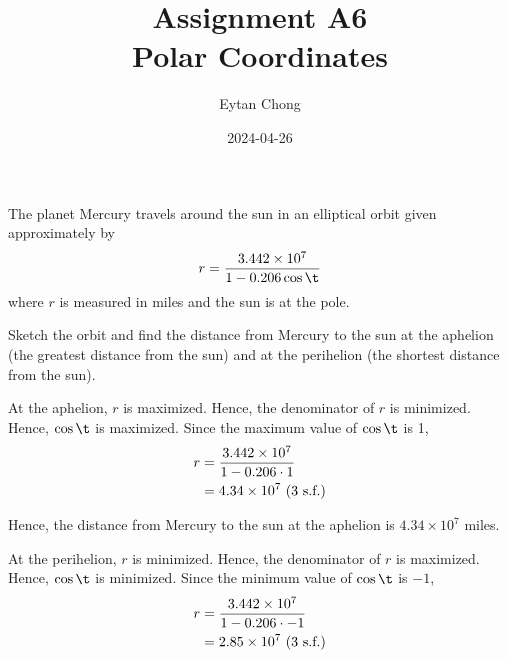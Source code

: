 \documentclass{echw}
\title{Assignment A6\\Polar Coordinates}
\author{Eytan Chong}
\date{2024-04-26}
\begin{document}
    \problem{}
        The planet Mercury travels around the sun in an elliptical orbit given approximately by
        \[
            r = \dfrac{3.442 \times 10^7}{1 - 0.206\cos\t}
        \]
         where $r$ is measured in miles and the sun is at the pole.

        Sketch the orbit and find the distance from Mercury to the sun at the aphelion (the greatest distance from the sun) and at the perihelion (the shortest distance from the sun).

    \solution
        \begin{center}
        \end{center}

        At the aphelion, $r$ is maximized. Hence, the denominator of $r$ is minimized. Hence, $\cos \t$ is maximized. Since the maximum value of $\cos \t$ is 1,
        \begin{align*}
            r &= \dfrac{3.442 \times 10^7}{1 - 0.206\cdot1}\\
            &= 4.34 \times 10^7 \text{ (3 s.f.)}
        \end{align*}

        Hence, the distance from Mercury to the sun at the aphelion is $4.34 \times 10^7$ miles.


        At the perihelion, $r$ is minimized. Hence, the denominator of $r$ is maximized. Hence, $\cos \t$ is minimized. Since the minimum value of $\cos \t$ is $-1$,
        \begin{align*}
            r &= \dfrac{3.442 \times 10^7}{1 - 0.206\cdot-1}\\
            &= 2.85 \times 10^7 \text{ (3 s.f.)}
        \end{align*}
\end{document}
